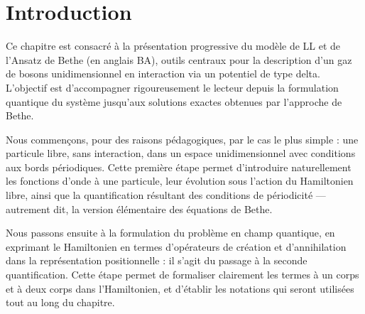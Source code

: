%
%
%
%

\section*{Introduction}

Ce chapitre est consacré à la présentation progressive du modèle de \gls{LL} et de l’Ansatz de Bethe (en anglais \gls{BA}), outils centraux pour la description d’un gaz de bosons unidimensionnel en interaction via un potentiel de type delta. L’objectif est d’accompagner rigoureusement le lecteur depuis la formulation quantique du système jusqu’aux solutions exactes obtenues par l’approche de Bethe.

\medskip

Nous commençons, pour des raisons pédagogiques, par le cas le plus simple : une particule libre, sans interaction, dans un espace unidimensionnel avec conditions aux bords périodiques. Cette première étape permet d’introduire naturellement les fonctions d’onde à une particule, leur évolution sous l’action du Hamiltonien libre, ainsi que la quantification résultant des conditions de périodicité — autrement dit, la version élémentaire des équations de Bethe.

\medskip

Nous passons ensuite à la formulation du problème en champ quantique, en exprimant le Hamiltonien en termes d’opérateurs de création et d’annihilation dans la représentation positionnelle : il s’agit du passage à la seconde quantification. Cette étape permet de formaliser clairement les termes à un corps et à deux corps dans l’Hamiltonien, et d’établir les notations qui seront utilisées tout au long du chapitre.

